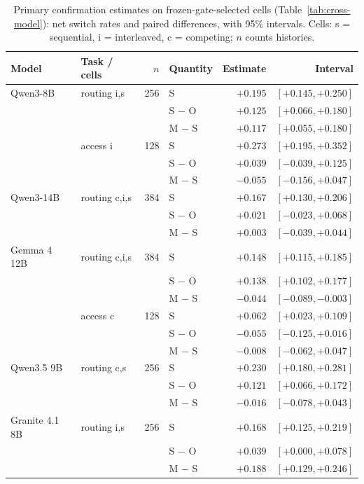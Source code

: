 \begin{table}[t]
\centering
\small
\setlength{\tabcolsep}{5pt}
\begin{tabular}{@{}llrlrr@{}}
\toprule
Model & Task / cells & $n$ & Quantity & Estimate & Interval \\
\midrule
Qwen3-8B & routing i,s & 256 & S & $+0.195$ & $[+0.145, +0.250]$ \\
 &  &  & S $-$ O & $+0.125$ & $[+0.066, +0.180]$ \\
 &  &  & M $-$ S & $+0.117$ & $[+0.055, +0.180]$ \\
 & access i & 128 & S & $+0.273$ & $[+0.195, +0.352]$ \\
 &  &  & S $-$ O & $+0.039$ & $[-0.039, +0.125]$ \\
 &  &  & M $-$ S & $-0.055$ & $[-0.156, +0.047]$ \\
\midrule
Qwen3-14B & routing c,i,s & 384 & S & $+0.167$ & $[+0.130, +0.206]$ \\
 &  &  & S $-$ O & $+0.021$ & $[-0.023, +0.068]$ \\
 &  &  & M $-$ S & $+0.003$ & $[-0.039, +0.044]$ \\
\midrule
Gemma 4 12B & routing c,i,s & 384 & S & $+0.148$ & $[+0.115, +0.185]$ \\
 &  &  & S $-$ O & $+0.138$ & $[+0.102, +0.177]$ \\
 &  &  & M $-$ S & $-0.044$ & $[-0.089, -0.003]$ \\
 & access c & 128 & S & $+0.062$ & $[+0.023, +0.109]$ \\
 &  &  & S $-$ O & $-0.055$ & $[-0.125, +0.016]$ \\
 &  &  & M $-$ S & $-0.008$ & $[-0.062, +0.047]$ \\
\midrule
Qwen3.5 9B & routing c,s & 256 & S & $+0.230$ & $[+0.180, +0.281]$ \\
 &  &  & S $-$ O & $+0.121$ & $[+0.066, +0.172]$ \\
 &  &  & M $-$ S & $-0.016$ & $[-0.078, +0.043]$ \\
\midrule
Granite 4.1 8B & routing i,s & 256 & S & $+0.168$ & $[+0.125, +0.219]$ \\
 &  &  & S $-$ O & $+0.039$ & $[+0.000, +0.078]$ \\
 &  &  & M $-$ S & $+0.188$ & $[+0.129, +0.246]$ \\
\bottomrule
\end{tabular}
\caption{Primary confirmation estimates on frozen-gate-selected cells (Table~\ref{tab:cross-model}): net switch rates and paired differences, with 95\% intervals. Cells: s = sequential, i = interleaved, c = competing; $n$ counts histories.}
\label{tab:cross-model-ci-switches}
\end{table}

